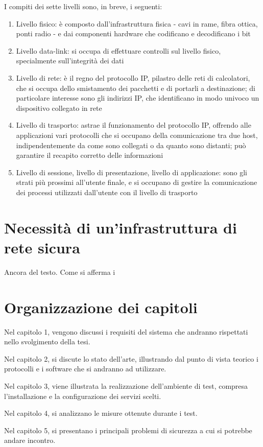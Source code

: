 I compiti dei sette livelli sono, in breve, i seguenti:
\begin{enumerate}
    \item Livello fisico: è composto dall'infrastruttura fisica - cavi in rame, fibra ottica, ponti radio - e dai componenti hardware che codificano e decodificano i bit
    \item Livello data-link: si occupa di effettuare controlli sul livello fisico, specialmente sull'integrità dei dati
    \item Livello di rete: è il regno del protocollo IP, pilastro delle reti di calcolatori, che si occupa dello smistamento dei pacchetti e di portarli a destinazione; di particolare interesse sono gli indirizzi IP, che identificano in modo univoco un dispositivo collegato in rete
    \item Livello di trasporto: astrae il funzionamento del protocollo IP, offrendo alle applicazioni vari protocolli che si occupano della comunicazione tra due host, indipendentemente da come sono collegati o da quanto sono distanti; può garantire il recapito corretto delle informazioni
    \item Livello di sessione, livello di presentazione, livello di applicazione: sono gli strati più prossimi all'utente finale, e si occupano di gestire la comunicazione dei processi utilizzati dall'utente con il livello di trasporto
\end{enumerate}


\section{Necessità di un'infrastruttura di rete sicura}

Ancora del testo. Come si afferma i
\section{Organizzazione dei capitoli}

Nel capitolo 1, vengono discussi i requisiti del sistema che andranno rispettati nello svolgimento della tesi.

Nel capitolo 2, si discute lo stato dell'arte, illustrando dal punto di vista teorico i protocolli e i software che si andranno ad utilizzare.

Nel capitolo 3, viene illustrata la realizzazione dell'ambiente di test, compresa l'installazione e la configurazione dei servizi scelti.

Nel capitolo 4, si analizzano le misure ottenute durante i test.

Nel capitolo 5, si presentano i principali problemi di sicurezza a cui si potrebbe andare incontro.

